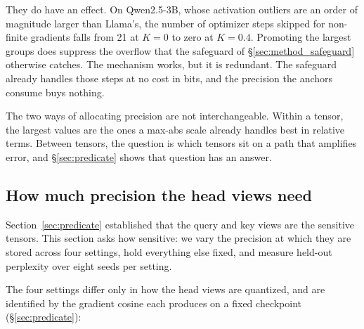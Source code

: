 \documentclass[11pt,letterpaper]{article}
\begin{document}
\medskip
They do have an effect. On Qwen2.5-3B, whose activation outliers are an order of magnitude larger than Llama's, the number of optimizer steps skipped for non-finite gradients falls from 21 at $K{=}0$ to zero at $K{=}0.4$. Promoting the largest groups does suppress the overflow that the safeguard of \S\ref{sec:method_safeguard} otherwise catches. The mechanism works, but it is redundant. The safeguard already handles those steps at no cost in bits, and the precision the anchors consume buys nothing.

\medskip
The two ways of allocating precision are not interchangeable. Within a tensor, the largest values are the ones a max-abs scale already handles best in relative terms. Between tensors, the question is which tensors sit on a path that amplifies error, and \S\ref{sec:predicate} shows that question has an answer.


\subsection{How much precision the head views need}
\label{sec:dose}

Section~\ref{sec:predicate} established that the query and key views are the sensitive tensors. This section asks how sensitive: we vary the precision at which they are stored across four settings, hold everything else fixed, and measure held-out perplexity over eight seeds per setting.

The four settings differ only in how the head views are quantized, and are identified by the gradient cosine each produces on a fixed checkpoint (\S\ref{sec:predicate}):
\end{document}
